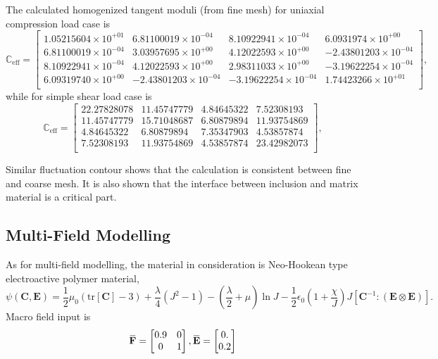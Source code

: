 \documentclass[10pt,a4paper]{scrreprt}
\newcommand{\overbar}[1]{\mkern 1.5mu\overline{\mkern-1.5mu#1\mkern-1.5mu}\mkern 1.5mu}
\begin{document}
The calculated homogenized tangent moduli (from fine mesh) for uniaxial compression load case is 
\begin{equation}
\mathbb{C}_{\text{eff}} = 
\begin{bmatrix}
1.05215604 \times 10^{+01} &  6.81100019\times 10^{-04}  & 8.10922941\times 10^{-04} & 6.0931974\times 10^{+00} \\
6.81100019\times 10^{-04} &  3.03957695\times 10^{+00} &  4.12022593\times 10^{+00} & -2.43801203\times 10^{-04}\\
8.10922941\times 10^{-04} &  4.12022593\times 10^{+00} &  2.98311033\times 10^{+00} & -3.19622254\times 10^{-04}\\
6.09319740\times 10^{+00} & -2.43801203\times 10^{-04} & -3.19622254\times 10^{-04} &  1.74423266\times 10^{+01}\\
\end{bmatrix},
\end{equation}
while for simple shear load case is 
\begin{equation}
\mathbb{C}_{\text{eff}} = 
\begin{bmatrix}
22.27828078 & 11.45747779 &  4.84645322 &  7.52308193 \\
11.45747779 & 15.71048687 &  6.80879894 & 11.93754869 \\
4.84645322 &  6.80879894  & 7.35347903 &  4.53857874 \\
7.52308193 & 11.93754869 &  4.53857874 & 23.42982073 \\
\end{bmatrix},
\end{equation}

Similar fluctuation contour shows that the calculation is consistent between fine and coarse mesh. It is also shown that the interface between inclusion and matrix material is a critical part.

\subsection{Multi-Field Modelling}
As for multi-field modelling, the material in consideration is Neo-Hookean type electroactive polymer material, 
\begin{equation}
\label{eq: nhk}
\psi\left( \mathbf{C}, \mathbf{E} \right) =  \frac{1}{2}\mu_{0} \left( \text{tr}[\mathbf{C}]-3 \right) + \dfrac{\lambda}{4} \left( J^{2}-1 \right) - \left( \dfrac{\lambda}{2} + \mu \right) \ln J - \frac{1}{2} \epsilon_{0} \left( 1+\dfrac{\chi}{J} \right) J \left[ \mathbf{C}^{-1}: (\mathbf{E} \otimes \mathbf{E}) \right].
\end{equation}
Macro field input is 
\[
\overbar{\mathbf{F}} = 
\begin{bmatrix}
0.9 & 0 \\
0 & 1 \\
\end{bmatrix},
\overbar{\mathbf{E}} = 
\begin{bmatrix}
0. \\
0.2
\end{bmatrix}
\]
\end{document}
